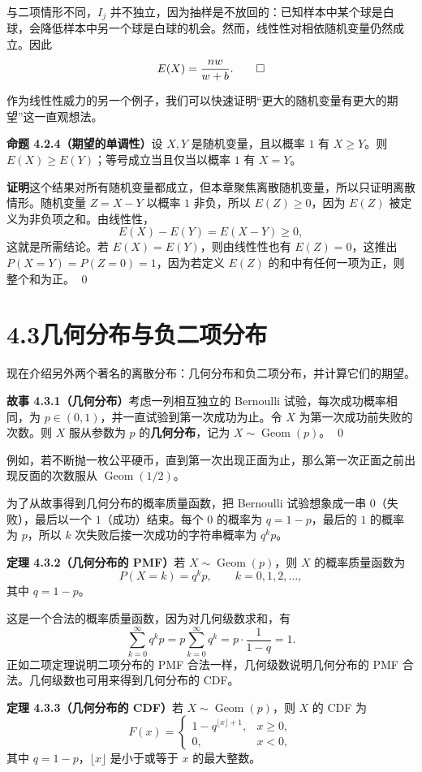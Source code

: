 \documentclass[UTF8,12pt,a4paper,fontset=fandol]{ctexart}
\begin{document}
与二项情形不同，$I_j$ 并不独立，因为抽样是不放回的：已知样本中某个球是白球，会降低样本中另一个球是白球的机会。然而，线性性对相依随机变量仍然成立。因此
\[
  E(X)=\frac{nw}{w+b}. \qed
\]

作为线性性威力的另一个例子，我们可以快速证明“更大的随机变量有更大的期望”这一直观想法。

\noindent\textbf{命题 4.2.4（期望的单调性）}\quad 设 $X,Y$ 是随机变量，且以概率 $1$ 有 $X\ge Y$。则 $E(X)\ge E(Y)$；等号成立当且仅当以概率 $1$ 有 $X=Y$。

\noindent\textbf{证明}\quad 这个结果对所有随机变量都成立，但本章聚焦离散随机变量，所以只证明离散情形。随机变量 $Z=X-Y$ 以概率 $1$ 非负，所以 $E(Z)\ge 0$，因为 $E(Z)$ 被定义为非负项之和。由线性性，
\[
  E(X)-E(Y)=E(X-Y)\ge 0,
\]
这就是所需结论。若 $E(X)=E(Y)$，则由线性性也有 $E(Z)=0$，这推出 $P(X=Y)=P(Z=0)=1$，因为若定义 $E(Z)$ 的和中有任何一项为正，则整个和为正。 \qed

\section*{4.3\quad 几何分布与负二项分布}

现在介绍另外两个著名的离散分布：几何分布和负二项分布，并计算它们的期望。

\noindent\textbf{故事 4.3.1（几何分布）}\quad 考虑一列相互独立的 Bernoulli 试验，每次成功概率相同，为 $p\in(0,1)$，并一直试验到第一次成功为止。令 $X$ 为第一次成功前失败的次数。则 $X$ 服从参数为 $p$ 的\textbf{几何分布}，记为 $X\sim\operatorname{Geom}(p)$。 \qed

例如，若不断抛一枚公平硬币，直到第一次出现正面为止，那么第一次正面之前出现反面的次数服从 $\operatorname{Geom}(1/2)$。

为了从故事得到几何分布的概率质量函数，把 Bernoulli 试验想象成一串 $0$（失败），最后以一个 $1$（成功）结束。每个 $0$ 的概率为 $q=1-p$，最后的 $1$ 的概率为 $p$，所以 $k$ 次失败后接一次成功的字符串概率为 $q^kp$。

\noindent\textbf{定理 4.3.2（几何分布的 PMF）}\quad 若 $X\sim\operatorname{Geom}(p)$，则 $X$ 的概率质量函数为
\[
  P(X=k)=q^kp,\qquad k=0,1,2,\ldots,
\]
其中 $q=1-p$。

这是一个合法的概率质量函数，因为对几何级数求和，有
\[
  \sum_{k=0}^{\infty}q^kp=p\sum_{k=0}^{\infty}q^k
  =p\cdot\frac{1}{1-q}=1.
\]
正如二项定理说明二项分布的 PMF 合法一样，几何级数说明几何分布的 PMF 合法。几何级数也可用来得到几何分布的 CDF。

\noindent\textbf{定理 4.3.3（几何分布的 CDF）}\quad 若 $X\sim\operatorname{Geom}(p)$，则 $X$ 的 CDF 为
\[
  F(x)=
  \begin{cases}
    1-q^{\lfloor x\rfloor+1}, & x\ge 0,\\
    0, & x<0,
  \end{cases}
\]
其中 $q=1-p$，$\lfloor x\rfloor$ 是小于或等于 $x$ 的最大整数。
\end{document}
